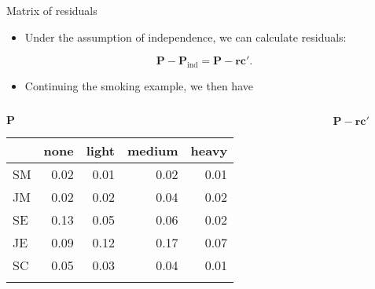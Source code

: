 \documentclass[
  ignorenonframetext,
  aspectratio=169]{beamer}
\providecommand{\tightlist}{%
  \setlength{\itemsep}{0pt}\setlength{\parskip}{0pt}}\usepackage{longtable,booktabs,array}
\begin{document}
\begin{frame}{Matrix of residuals}
\protect\hypertarget{matrix-of-residuals}{}
\begin{itemize}
\tightlist
\item
  Under the assumption of independence, we can calculate residuals:
\end{itemize}

\[
\symbf{P} - \symbf{P}_{\mathrm{ind}} = \symbf{P} - \symbf{r}\symbf{c}'.
\]

\begin{itemize}
\tightlist
\item
  Continuing the smoking example, we then have
\end{itemize}

\begin{columns}[T]
\begin{column}{0.45\textwidth}
\begin{center} 

$\symbf{P}$

\end{center}

\vspace{0.05cm}

\begin{longtable}[]{@{}lrrrr@{}}
\toprule\noalign{}
& none & light & medium & heavy \\
\midrule\noalign{}
\endhead
SM & 0.02 & 0.01 & 0.02 & 0.01 \\
JM & 0.02 & 0.02 & 0.04 & 0.02 \\
SE & 0.13 & 0.05 & 0.06 & 0.02 \\
JE & 0.09 & 0.12 & 0.17 & 0.07 \\
SC & 0.05 & 0.03 & 0.04 & 0.01 \\
\bottomrule\noalign{}
\end{longtable}
\end{column}

\begin{column}{0.025\textwidth}
\end{column}

\begin{column}{0.525\textwidth}
\begin{center}

$\symbf{P} - \symbf{r}\symbf{c}'$

\end{center}

\vspace{0.05cm}


\end{column}
\end{columns}
\end{frame}
\end{document}
